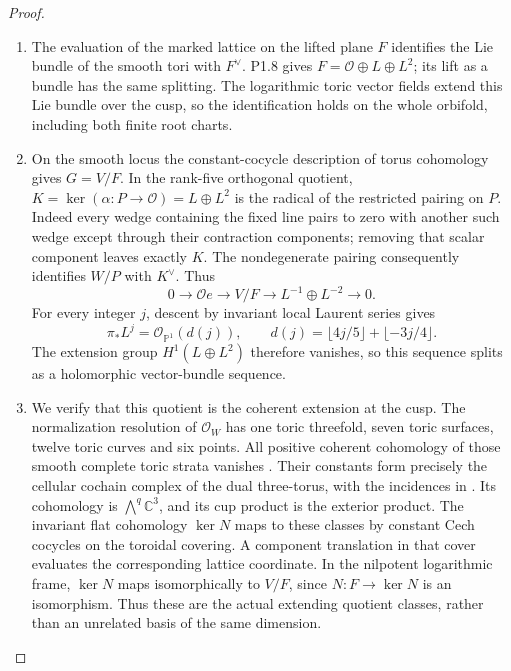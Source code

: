 \begin{proof}
\begin{enumerate}[label=\arabic*.]
\item The evaluation of the marked lattice on the lifted plane $F$
identifies the Lie bundle of the smooth tori with $F^\vee$.
P1.8 gives $F=\mathcal O\oplus L\oplus L^2$; its lift as a bundle
has the same splitting. The logarithmic toric vector fields extend
this Lie bundle over the cusp, so the identification holds on the
whole orbifold, including both finite root charts.

\item On the smooth locus the constant-cocycle description of torus
cohomology gives $G=V/F$. In the rank-five orthogonal quotient,
$K=\ker(\alpha:P\to\mathcal O)=L\oplus L^2$ is the radical of
the restricted pairing on $P$. Indeed every wedge containing the
fixed line pairs to zero with another such wedge except through
their contraction components; removing that scalar component
leaves exactly $K$. The nondegenerate pairing consequently
identifies $W/P$ with $K^\vee$. Thus
\[
 0\longrightarrow\mathcal O e\longrightarrow V/F
   \longrightarrow L^{-1}\oplus L^{-2}\longrightarrow0.
\]
For every integer $j$, descent by invariant local Laurent series gives
\begin{equation}\label{eq:P1Adegree}
 \pi_*L^j=\mathcal O_{\mathbb P^1}(d(j)),\qquad
 d(j)=\lfloor4j/5\rfloor+\lfloor-3j/4\rfloor.
\end{equation}
The extension group $H^1(L\oplus L^2)$ therefore vanishes, so this
sequence splits as a holomorphic vector-bundle sequence.

\item We verify that this quotient is the coherent extension at the cusp.
The normalization resolution of $\mathcal O_W$ has one toric
threefold, seven toric surfaces, twelve toric curves and six points.
All positive coherent cohomology of those smooth complete toric
strata vanishes \cite[Theorem 9.2.3, p.~410]{CoxLittleSchenck2011}. Their constants form precisely the cellular
cochain complex of the dual three-torus, with the incidences in
. Its cohomology is
$\bigwedge^q\mathbb C^3$, and its cup product is the exterior product.
The invariant flat cohomology $\ker N$ maps to these classes by
constant Cech cocycles on the toroidal covering. A component
translation in that cover evaluates the corresponding lattice
coordinate. In the nilpotent logarithmic frame, $\ker N$ maps
isomorphically to $V/F$, since $N:F\to\ker N$ is an isomorphism.
Thus these are the actual extending quotient classes, rather than
an unrelated basis of the same dimension.


\end{enumerate}
\end{proof}
